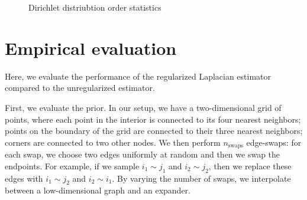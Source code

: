 \documentclass[12pt]{article}
\theoremstyle{plain}
\begin{document}
\begin{figure}
    \centering
    \caption{Dirichlet distriubtion order statistics}
\end{figure}

\section{Empirical evaluation}

Here, we evaluate the performance of the regularized Laplacian
estimator compared to the unregularized estimator.

First, we evaluate the prior.  In our setup, we
have a two-dimensional grid of points, where each point in the
interior is connected to its four nearest neighbors; points on the
boundary of the grid are connected to their three nearest neighbors;
corners are connected to two other nodes.  We then perform
$n_\text{swaps}$ edge-swaps: for each swap, we choose two edges
uniformly at random and then we swap the endpoints.  For example, if
we sample $i_1 \sim j_1$ and $i_2 \sim j_2$, then we replace these
edges with $i_1 \sim j_2$ and $i_2 \sim i_1$.  By varying the number
of swaps, we interpolate between a low-dimensional graph and an expander.
\end{document}

